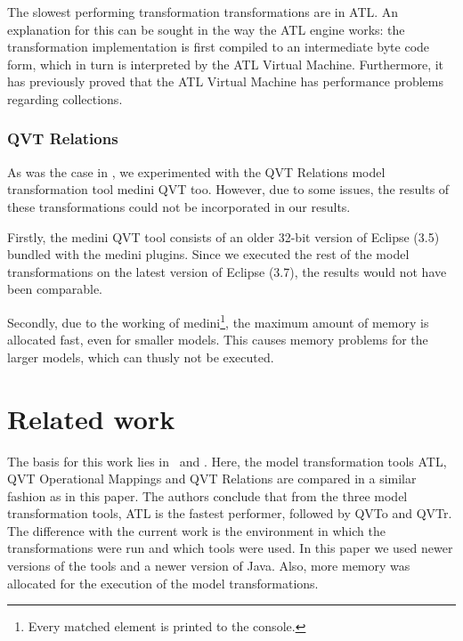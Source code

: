 \documentclass[12pt]{elsarticle}
\begin{document}
The slowest performing transformation transformations are in ATL. An explanation
for this can be sought in the way the ATL engine works: the transformation
implementation is first compiled to an intermediate byte code form, which in turn
is interpreted by the ATL Virtual Machine. Furthermore, it has previously proved
that the ATL Virtual Machine has performance problems regarding collections.
\cite{cuadrado10}


\subsubsection*{QVT Relations}
As was the case in \cite{amstel2011}, we experimented with the QVT Relations
model transformation tool medini QVT \cite{mediniQVT} too. However, due to some
issues, the results of these transformations could not be incorporated in our
results.

Firstly, the medini QVT tool consists of an older 32-bit version of Eclipse
(3.5) bundled with the medini plugins. Since we executed the rest of the model
transformations on the latest version of Eclipse (3.7), the results would not
have been comparable.

Secondly, due to the working of medini\footnote{Every matched element is
printed to the console.}, the maximum amount of memory is allocated fast, even
for smaller models. This causes memory problems for the larger models, which can
thusly not be executed.


\section{Related work}\label{sec:rel_work}

The basis for this work lies in~\cite{bosems2011} and \cite{amstel2011}. Here,
the model transformation tools ATL, QVT Operational Mappings and QVT Relations are
compared in a similar fashion as in this paper. The authors conclude that from
the three model transformation tools, ATL is the fastest performer, followed by
QVTo and QVTr. The difference with the current work is the environment in which
the transformations were run and which tools were used. In this paper we used
newer versions of the tools and a newer version of Java. Also, more memory was
allocated for the execution of the model transformations.
\end{document}
